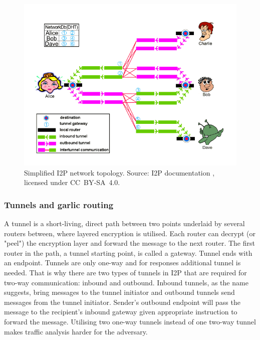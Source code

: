 \begin{figure}[ht]
  \centering
  \includegraphics[width=0.75\linewidth]{Images/i2p.png}
  \caption{Simplified I2P network topology. Source: I2P documentation \cite{i2p-topology}, licensed under CC BY‑SA 4.0.}
  \label{fig:i2p-topology}
\end{figure}

\subsubsection{Tunnels and garlic routing}
A tunnel is a short-living, direct path between two points underlaid by several routers between, where layered encryption is utilised. Each router can decrypt (or "peel") the encryption layer and forward the message to the next router. The first router in the path, a tunnel starting point, is called a gateway. Tunnel ends with an endpoint. Tunnels are only one-way and for responses additional tunnel is needed. That is why there are two types of tunnels in I2P that are required for two-way communication: inbound and outbound. Inbound tunnels, as the name suggests, bring messages to the tunnel initiator and outbound tunnels send messages from the tunnel initiator. Sender’s outbound endpoint will pass the message to the recipient’s inbound gateway given appropriate instruction to forward the message. Utilising two one-way tunnels instead of one two-way tunnel makes traffic analysis harder for the adversary.

